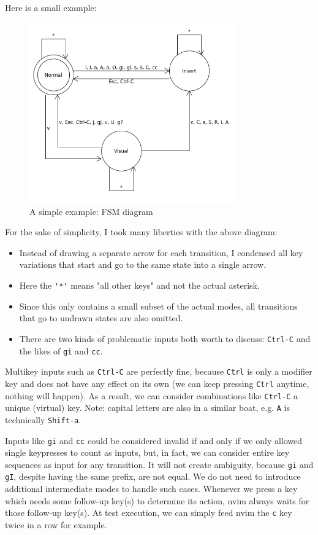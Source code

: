 \documentclass[12pt]{article}
\begin{document}
		Here is a small example:

		\begin{figure}[h]
			\centering
			\includegraphics[width=0.8\textwidth]{images/FSM_simple_example.png}
			\caption{A simple example: FSM diagram}
		\end{figure}

		For the sake of simplicity, I took many liberties with the above diagram:
		\begin{itemize}
			\item{Instead of drawing a separate arrow for each transition, I condensed all key variations that start and go to the same state into a single arrow.}
			\item{Here the \verb|'*'| means "all other keys" and not the actual asterisk.}
			\item{Since this only contains a small subset of the actual modes, all transitions that go to undrawn states are also omitted.}
			\item{There are two kinds of problematic inputs both worth to discuss: \verb|Ctrl-C| and the likes of \verb|gi| and \verb|cc|.}
		\end{itemize}

		Multikey inputs such as \verb|Ctrl-C| are perfectly fine, because \verb|Ctrl| is only a modifier key and does not have any effect on its own (we can keep pressing \verb|Ctrl| anytime, nothing will happen). As a result, we can consider combinations like \verb|Ctrl-C| a unique (virtual) key. Note: capital letters are also in a similar boat, e.g. \verb|A| is technically \verb|Shift-a|.

		Inputs like \verb|gi| and \verb|cc| could be considered invalid if and only if we only allowed single keypresses to count as inputs, but, in fact, we can consider entire key sequences as input for any transition. It will not create ambiguity, because \verb|gi| and \verb|gI|, despite having the same prefix, are not equal. We do not need to introduce additional intermediate modes to handle such cases. Whenever we press a key which needs some follow-up key(s) to determine its action, nvim always waits for those follow-up key(s). At test execution, we can simply feed nvim the \verb|c| key twice in a row for example.
\end{document}
